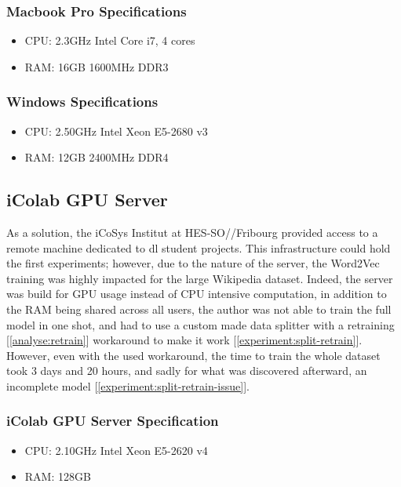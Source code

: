 \subsubsection{Macbook Pro Specifications}
\begin{itemize}
    \setlength\itemsep{0em}
    \item CPU: 2.3GHz Intel Core i7, 4 cores
    \item RAM: 16GB 1600MHz DDR3
\end{itemize}

\subsubsection{Windows Specifications}
\begin{itemize}
    \setlength\itemsep{0em}
    \item CPU: 2.50GHz Intel Xeon E5-2680 v3
    \item RAM: 12GB 2400MHz DDR4 
\end{itemize}

\subsection{iColab GPU Server}
\label{experiment:icolab}
As a solution, the iCoSys Institut at HES-SO//Fribourg provided access to a remote machine dedicated to \gls{dl} student projects. This infrastructure could hold the first experiments; however, due to the nature of the server, the Word2Vec training was highly impacted for the large Wikipedia dataset. Indeed, the server was build for GPU usage instead of CPU intensive computation, in addition to the RAM being shared across all users, the author was not able to train the full model in one shot, and had to use a custom made data splitter with a retraining [\ref{analyse:retrain}] workaround to make it work [\ref{experiment:split-retrain}].\\

However, even with the used workaround, the time to train the whole dataset took 3 days and 20 hours, and sadly for what was discovered afterward, an incomplete model [\ref{experiment:split-retrain-issue}].

\subsubsection{iColab GPU Server Specification}
\begin{itemize}
    \setlength\itemsep{0em}
    \item CPU: 2.10GHz Intel Xeon E5-2620 v4
    \item RAM: 128GB
\end{itemize}


